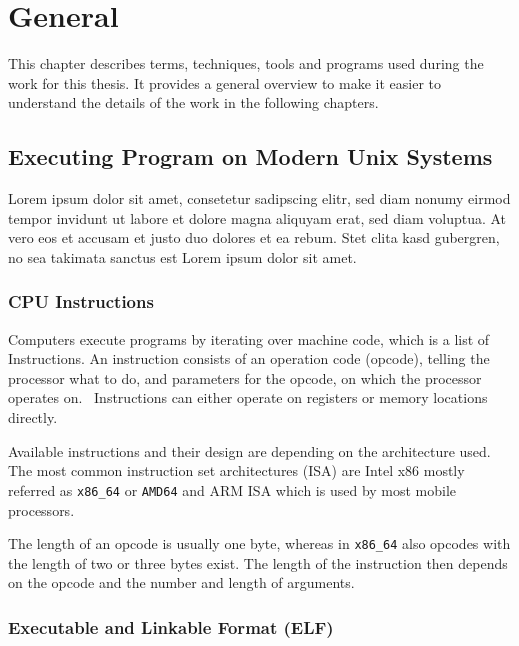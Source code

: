 \chapter{General}\label{sec:general}

This chapter describes terms, techniques, tools and programs used during the
work for this thesis. It provides a general overview to make it easier to
understand the details of the work in the following chapters.

\section{Executing Program on Modern Unix Systems}


Lorem ipsum dolor sit amet, consetetur sadipscing elitr, sed diam nonumy eirmod
tempor invidunt ut labore et dolore magna aliquyam erat, sed diam voluptua. At
vero eos et accusam et justo duo dolores et ea rebum. Stet clita kasd gubergren,
no sea takimata sanctus est Lorem ipsum dolor sit amet.

\subsection{CPU Instructions}

Computers execute programs by iterating over machine code, which is a list of
Instructions. An instruction consists of an operation code (opcode), telling the
processor what to do, and parameters for the opcode, on which the processor
operates on.~ Instructions can either
operate on registers or memory locations directly.

Available instructions and their design are depending on the architecture used.
The most common instruction set architectures (ISA) are Intel x86 mostly
referred as \texttt{x86\_64} or \texttt{AMD64} and ARM ISA which is used by most
mobile processors.

The length of an opcode is usually one byte, whereas in \texttt{x86\_64} also
opcodes with the length of two or three bytes exist. The length of the
instruction then depends on the opcode and the number and length of arguments.


\subsection{Executable and Linkable Format (ELF)}

